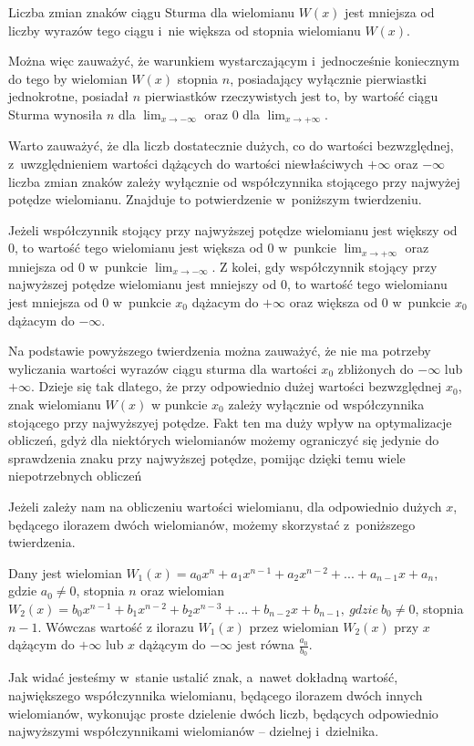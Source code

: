 \begin{theorem}
	$ $ \\
	Liczba zmian znaków ciągu Sturma dla wielomianu $W(x)$ jest mniejsza od liczby wyrazów tego ciągu i~nie większa od stopnia wielomianu $W(x)$.
\end{theorem}

Można więc zauważyć, że warunkiem wystarczającym i~jednocześnie koniecznym do tego by wielomian $W(x)$ stopnia $n$, posiadający wyłącznie pierwiastki jednokrotne, posiadał $n$ pierwiastków rzeczywistych jest to, by wartość ciągu Sturma wynosiła $n$ dla $\lim_{x \to -\infty}$ oraz $0$ dla $\lim_{x \to +\infty}$. 

Warto zauważyć, że dla liczb dostatecznie dużych, co do wartości bezwzględnej, z~uwzględnieniem wartości dążących do wartości niewłaściwych $+\infty$ oraz $-\infty$ liczba zmian znaków zależy wyłącznie od współczynnika stojącego przy najwyżej potędze wielomianu. Znajduje to potwierdzenie w~poniższym twierdzeniu.

\begin{theorem}
	$ $ \\
	Jeżeli współczynnik stojący przy najwyższej potędze wielomianu jest większy od $0$, to wartość tego wielomianu jest większa od $0$ w~punkcie $\lim_{x \to +\infty}$ oraz mniejsza od $0$ w~punkcie $\lim_{x \to -\infty}$.
	Z kolei, gdy współczynnik stojący przy najwyższej potędze wielomianu jest mniejszy od $0$, to wartość tego wielomianu jest mniejsza od $0$ w~punkcie $x_0$ dążacym do $+\infty$ oraz większa od $0$ w~punkcie $x_0$ dążacym do $-\infty$.
\end{theorem}

Na podstawie powyższego twierdzenia można zauważyć, że nie ma potrzeby wyliczania wartości wyrazów ciągu sturma dla wartości $x_0$ zbliżonych do $-\infty$ lub $+\infty.$ Dzieje się tak dlatego, że przy odpowiednio dużej wartości bezwzględnej $x_0$, znak wielomianu $W(x)$ w punkcie $x_0$ zależy wyłącznie od współczynnika stojącego przy najwyższyej potędze. Fakt ten ma duży wpływ na optymalizacje obliczeń, gdyż dla niektórych wielomianów możemy ograniczyć się jedynie do sprawdzenia znaku przy najwyższej potędze, pomijąc dzięki temu wiele niepotrzebnych obliczeń

Jeżeli zależy nam na obliczeniu wartości wielomianu, dla odpowiednio dużych $x$, będącego ilorazem dwóch wielomianów, możemy skorzystać z~poniższego twierdzenia.

\begin{theorem}
	$ $ \\
	Dany jest wielomian $W_1(x) = a_0x^n + a_1x^{n-1} + a_2x^{n-2} + ... + a_{n-1}x + a_n$, gdzie $a_0 \ne 0$, stopnia $n$ oraz wielomian $W_2(x) = b_0x^{n-1} + b_1x^{n-2} + b_2x^{n-3} + ... + b_{n-2}x + b_{n-1},\ gdzie\ b_0 \ne 0$, stopnia $n-1$. Wówczas
	wartość z ilorazu $W_1(x)$ przez wielomian $W_2(x)$ przy $x$ dążącym do $+\infty$ lub $x$ dążącym do $-\infty$ jest równa $\frac{a_0}{b_0}$.
\end{theorem}

Jak widać jesteśmy w~stanie ustalić znak, a~nawet dokładną wartość, największego współczynnika wielomianu, będącego ilorazem dwóch innych wielomianów, wykonując proste dzielenie dwóch liczb, będących odpowiednio najwyższymi współczynnikami wielomianów -- dzielnej i~dzielnika.